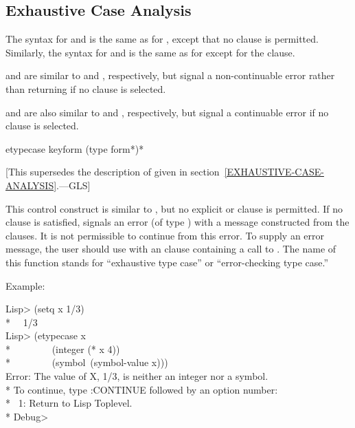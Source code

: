 \subsection{Exhaustive Case Analysis}
\label{EXHAUSTIVE-CASE-ANALYSIS-CONDITIONS}

The syntax for  and  is the same as for , except
that no  clause is permitted. Similarly, the syntax for  and
 is the same as for  except for the  clause.

 and  are similar to  and , respectively, but signal
a non-continuable error rather than returning  if no clause is selected.

 and  are also similar to  and , respectively,
but signal a
continuable error if no clause is selected.

\begin{defmac}
etypecase keyform {(type {form}*)}*

   [This supersedes the description of 
   given in section~\ref{EXHAUSTIVE-CASE-ANALYSIS}.---GLS]

  This control construct is similar to , but no explicit 
  or  clause is permitted. If no clause is satisfied,  signals 
  an error (of type ) with a message constructed from the clauses.
  It is not permissible to continue from this error. To supply an error
  message, the user should use  with an  clause containing 
  a call to . The name of this function stands for ``exhaustive type
  case'' or ``error-checking type case.''

  Example:
\begin{lisp}
Lisp> (setq x 1/3) \\*
~\EV\ 1/3 \\
Lisp> (etypecase x \\*
~~~~~~~~(integer (* x 4)) \\*
~~~~~~~~(symbol~(symbol-value x))) \\
Error: The value of X, 1/3, is neither an integer nor a symbol. \\*
To continue, type :CONTINUE followed by an option number: \\*
~1: Return to Lisp Toplevel. \\*
Debug>
\end{lisp}
\end{defmac}

